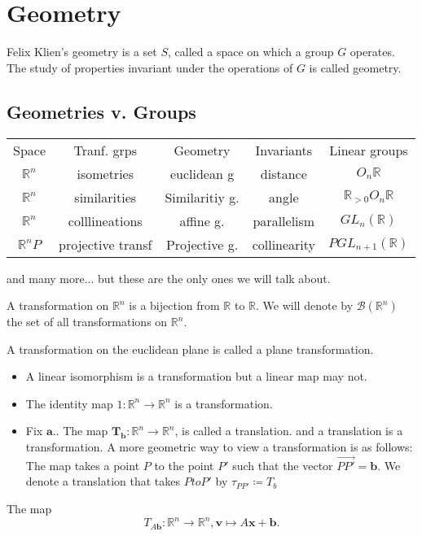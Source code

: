 
\section{Geometry}
\begin{definition}
  Felix Klien's geometry is a set \( S \), called a space
  on which a group \( G \) operates. The study of properties invariant
  under the operations of \( G \) is called geometry. 
\end{definition}

\subsection{Geometries v. Groups}
\begin{center}
\begin{tabular}{ c c c c c}
  Space & Tranf. grps & Geometry & Invariants & Linear groups \\
  \( \mathbb{R}^n \) & isometries & euclidean g & distance & \( O_n{\mathbb{R}} \) \\
  \( \mathbb{R}^n \) & similarities & Similaritiy g. & angle & \( \mathbb{R}_{>0} O_n{\mathbb{R}}\) \\
  \( \mathbb{R}^n \) & colllineations & affine g. & parallelism & \(GL_n(\mathbb{R})\) \\
  \( \mathbb{R}^nP \) & projective transf & Projective g. & collinearity & \( PGL_{n+1}(\mathbb{R})\)
\end{tabular}
\end{center}
and many more...
but these are the only ones we will talk about.

\begin{definition}
  A transformation on \( \mathbb{R}^n \) is a bijection from \( \mathbb{R} \) to \( \mathbb{R} \).
  We will denote by \( \mathscr{B}(\mathbb{R}^n) \) the set of all transformations on \(\mathbb{R}^n\).
\end{definition}

\begin{definition}
  A transformation on the euclidean plane is called a plane transformation.
\end{definition}

 \begin{itemize}
  \item A linear isomorphism is a transformation but a linear map may not. 
  \item The identity map \( 1: \mathbb{R}^n \to \mathbb{R}^n \) is a transformation.
  \item Fix \( \boldsymbol{a}. \). The map \( \boldsymbol{T_b}: \mathbb{R}^n \to \mathbb{R}^n  \), is called a translation.
  and a translation is a transformation. A more geometric way to view a transformation is as follows: The map
  takes a point $P$ to the point $P'$ such that the vector \( \overrightarrow{PP'} = \boldsymbol{b}\).
  We denote a translation that takes \( P to P' \) by \( \tau_{PP'} \coloneqq  T_b\)
 \end{itemize}

 \begin{notation}
  The map \[
    T_{A \boldsymbol{b}}: \mathbb{R}^n \to \mathbb{R}^n, \boldsymbol{v} \mapsto A \boldsymbol{x} + \boldsymbol{b}
  .\] 
 \end{notation}

 
